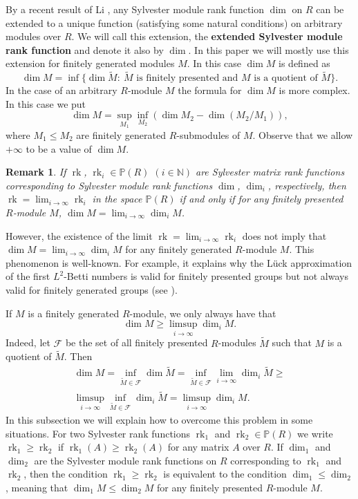 \documentclass[11pt]{amsart}
\newtheorem{rem}[lem]{Remark}
\numberwithin{claimcounter}{lem}
\DeclareMathOperator{\rk}{rk}
\newcommand{\N}{\mathbb{N}}
\begin{document}
By a recent result of Li \cite{Li19}, any Sylvester module rank function $\dim$ on $R$ can be extended to a unique function (satisfying some natural conditions) on    arbitrary modules over $R$.  We will call this extension, the {\bf extended Sylvester module rank function} and denote it also by $\dim$. In this paper we will mostly use this extension for   finitely generated modules $M$. In this case $\dim M$ is defined as 
\begin{equation} \label{liext}
\dim M=\inf \{\dim \widetilde M:\ \widetilde M \textrm{\ is   finitely presented   and\ } M \textrm{\ is a quotient of\ }\widetilde M\}.\end{equation}
In the case of an arbitrary $R$-module $M$ the formula for $\dim M$ is more  complex. In this case we put
$$\dim M=\sup _{M_1} \inf _{M_2}( \dim M_2-\dim (M_2/M_1)),$$ where $M_1\le M_2$ are finitely generated $R$-submodules of $M$. Observe that we allow $+\infty$ to be a value of $\dim M$.
\begin{rem}\label{limitdim}
If $\rk$, $\rk_i\in \mathbb{P}(R)$  $(i\in \N)$ are Sylvester matrix rank functions corresponding to Sylvester module rank functions $\dim$,  $\dim_i$, respectively, then $\rk=\displaystyle \lim_{i\to \infty} \rk_i$ in the space $\mathbb{P}(R)$ if and only if for any finitely presented $R$-module $M$, $\dim M=\displaystyle  \lim_{i\to \infty} \dim_i M$. 
\end{rem}
However, the existence of the limit $\rk=\displaystyle \lim_{i\to \infty} \rk_i$ does not imply that $\dim M=\displaystyle  \lim_{i\to \infty} \dim_i M$ for any finitely generated $R$-module $M$. This phenomenon  is well-known. For example, it explains why   the L\"uck approximation of the first $L^2$-Betti numbers is valid for finitely presented groups but not always valid for finitely generated groups (see \cite{LO11}).

 If $M$ is a finitely generated $R$-module, we  only always have that  
 \begin{equation}\label{easyin}
 \dim M \ge   \limsup_{i\to \infty} \dim_i M.
 \end{equation}
 Indeed, let $\mathcal F$ be the set of all finitely presented $R$-modules $\tilde M$ such that $M$ is a quotient of $\tilde M$. Then  
\begin{multline*}
\dim M=\inf_{\tilde M\in \mathcal F}\dim \tilde M=\inf_{\tilde M\in \mathcal F}\lim_{i\to \infty} \dim_i \tilde M\ge\\ \limsup_{i\to \infty} \inf_{\tilde M\in \mathcal F}\dim_i \tilde M= \limsup_{i\to \infty} \dim_i M.\end{multline*}
In this subsection we will explain how to overcome this problem in some situations. For two Sylvester rank functions $\rk_1$ and $\rk_2\in \mathbb P(R)$ we write $\rk_1\ge \rk_2$ if $\rk_1(A)\ge \rk_2(A)$ for any matrix $A$ over $R$. If $\dim_1$ and $\dim_2$ are the Sylvester module rank functions on $R$ corresponding to $\rk_1$ and $\rk_2$, then the condition $\rk_1\ge \rk_2$ is equivalent to the condition $\dim_1\le \dim_2$, meaning that $\dim_1 M\le \dim_2 M$ for any finitely presented $R$-module $M$.
\end{document}
